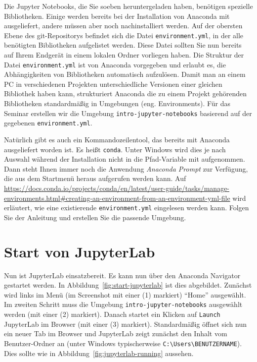 \documentclass{tufte-handout}
\begin{document}
Die Jupyter Notebooks, die Sie soeben heruntergeladen haben, benötigen  spezielle Bibliotheken.
Einige werden bereits bei der Installation von Anaconda mit ausgeliefert, andere müssen aber noch nachinstalliert werden.
Auf der obersten Ebene des git-Repositorys befindet sich die Datei \texttt{environment.yml}, in der alle benötigten Bibliotheken aufgelistet werden.
Diese Datei sollten Sie nun bereits auf Ihrem Endgerät in einem lokalen Ordner vorliegen haben.
Die Struktur der Datei \texttt{environment.yml} ist von Anaconda vorgegeben und erlaubt es, die Abhängigkeiten von Bibliotheken automatisch aufzulösen.
Damit man an einem PC in verschiedenen Projekten unterschiedliche Versionen einer gleichen Bibliothek haben kann,
strukturiert Anaconda die zu einem Projekt gehörenden Bibliotheken standardmäßig in Umgebungen (eng. Environments).
Für das Seminar erstellen wir die Umgebung \texttt{intro-jupyter-notebooks} basierend auf der gegebenen \texttt{environment.yml}.

Natürlich gibt es auch ein Kommandozeilentool, das bereits mit Anaconda ausgeliefert worden ist.
Es heißt \texttt{conda}.
Unter Windows wird dies je nach Auswahl während der Installation nicht in die Pfad-Variable mit aufgenommen.
Dann steht Ihnen immer noch die Anwendung \emph{Anaconda Prompt} zur Verfügung, die aus dem Startmenü heraus aufgerufen werden kann.
Auf
\url{https://docs.conda.io/projects/conda/en/latest/user-guide/tasks/manage-environments.html#creating-an-environment-from-an-environment-yml-file}
wird erläutert, wie eine existierende \texttt{environment.yml} eingelesen werden kann.
Folgen Sie der Anleitung und erstellen Sie die passende Umgebung.

\section{Start von JupyterLab}

Nun ist JupyterLab einsatzbereit.
Es kann nun über den Anaconda Navigator gestartet werden.
In Abbildung~\ref{fig:start-jupyterlab} ist dies abgebildet.
Zunächst wird links im Menü
(im Screenshot mit einer (1) markiert)
\enquote{Home} ausgewählt.
Im zweiten Schritt muss die Umgebung \texttt{intro-jupyter-notebooks} ausgewählt werden
(mit einer (2) markiert).
Danach startet ein Klicken auf \texttt{Launch} JupyterLab im Browser
(mit einer (3) markiert).
Standardmäßig öffnet sich nun ein neuer Tab im Browser und JupyterLab zeigt zunächst den Inhalt vom Benutzer-Ordner an (unter Windows typischerweise \texttt{C:\textbackslash{}Users\textbackslash{}BENUTZERNAME}).
Dies sollte wie in Abbildung~\ref{fig:jupyterlab-running} aussehen.
\end{document}
